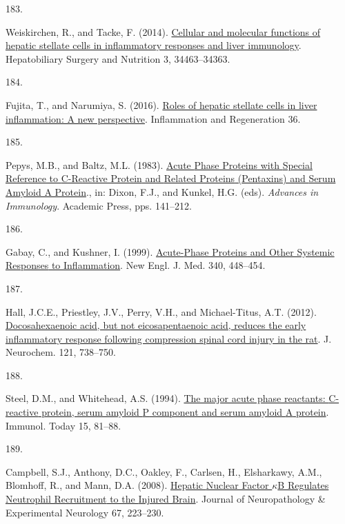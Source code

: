 \documentclass[
]{article}
\newlength{\cslhangindent}
\newlength{\csllabelwidth}
\newlength{\cslentryspacingunit} %
\newenvironment{CSLReferences}[2] %
 {%
  \setlength{\parindent}{0pt}
  \ifodd #1
  \let\oldpar\par
  \def\par{\hangindent=\cslhangindent\oldpar}
  \fi
  \setlength{\parskip}{#2\cslentryspacingunit}
 }%
 {}
\newcommand{\CSLLeftMargin}[1]{\parbox[t]{\csllabelwidth}{#1}}
\newcommand{\CSLRightInline}[1]{\parbox[t]{\linewidth - \csllabelwidth}{#1}\break}
\begin{document}
\begin{CSLReferences}{0}{0}
\leavevmode{}%
\CSLLeftMargin{183. }
\CSLRightInline{Weiskirchen, R., and Tacke, F. (2014). \href{https://doi.org/10.3978/j.issn.2304-3881.2014.11.03}{Cellular and molecular functions of hepatic stellate cells in inflammatory responses and liver immunology}. Hepatobiliary Surgery and Nutrition 3, 34463--34363.}

\leavevmode{}%
\CSLLeftMargin{184. }
\CSLRightInline{Fujita, T., and Narumiya, S. (2016). \href{https://doi.org/10.1186/s41232-016-0005-6}{Roles of hepatic stellate cells in liver inflammation: A new perspective}. Inflammation and Regeneration 36.}

\leavevmode{}%
\CSLLeftMargin{185. }
\CSLRightInline{Pepys, M.B., and Baltz, M.L. (1983). \href{https://doi.org/10.1016/S0065-2776(08)60379-X}{Acute {Phase Proteins} with {Special Reference} to {C-Reactive Protein} and {Related Proteins} ({Pentaxins}) and {Serum Amyloid A Protein}}., in: Dixon, F.J., and Kunkel, H.G. (eds). \emph{Advances in {Immunology}}. {Academic Press}, pps. 141--212.}

\leavevmode{}%
\CSLLeftMargin{186. }
\CSLRightInline{Gabay, C., and Kushner, I. (1999). \href{https://doi.org/10.1056/NEJM199902113400607}{Acute-{Phase Proteins} and {Other Systemic Responses} to {Inflammation}}. New Engl. J. Med. 340, 448--454.}

\leavevmode{}%
\CSLLeftMargin{187. }
\CSLRightInline{Hall, J.C.E., Priestley, J.V., Perry, V.H., and Michael-Titus, A.T. (2012). \href{https://doi.org/10.1111/j.1471-4159.2012.07726.x}{Docosahexaenoic acid, but not eicosapentaenoic acid, reduces the early inflammatory response following compression spinal cord injury in the rat}. J. Neurochem. 121, 738--750.}

\leavevmode{}%
\CSLLeftMargin{188. }
\CSLRightInline{Steel, D.M., and Whitehead, A.S. (1994). \href{https://doi.org/10.1016/0167-5699(94)90138-4}{The major acute phase reactants: {C-reactive} protein, serum amyloid {P} component and serum amyloid {A} protein}. Immunol. Today 15, 81--88.}

\leavevmode{}%
\CSLLeftMargin{189. }
\CSLRightInline{Campbell, S.J., Anthony, D.C., Oakley, F., Carlsen, H., Elsharkawy, A.M., Blomhoff, R., and Mann, D.A. (2008). \href{https://doi.org/10.1097/NEN.0b013e3181654957}{Hepatic {Nuclear Factor \(\kappa\)B Regulates Neutrophil Recruitment} to the {Injured Brain}}. Journal of Neuropathology \& Experimental Neurology 67, 223--230.}


\end{CSLReferences}
\end{document}
